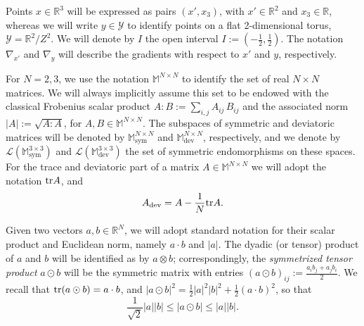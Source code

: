 \documentclass[reqno,10pt]{amsart}
\numberwithin{equation}{section}
\theoremstyle{remark}
\newcommand{\M}{\mathbb{M}}
\newcommand{\R}{\mathbb{R}}
\newcommand{\calY}{\mathcal{Y}}
\DeclareMathOperator{\dev}{dev}
\DeclareMathOperator{\sym}{sym}
\begin{document}
Points $x \in \R^3$ will be expressed as pairs $(x',x_3)$, with $x' \in \R^2$ and $x_3 \in \R$, whereas we will write $y \in \calY$ to identify points on a flat 2-dimensional torus, $\mathcal{Y}=\R^2/ Z^2$.
We will denote by $I$ the open interval $I := \left(-\frac{1}{2}, \frac{1}{2}\right)$.
The notation $\nabla_{x'}$ and $\nabla_{y}$ will describe the gradients with respect to $x'$ and $y$, respectively.

For $N=2,3$, we use the notation $\M^{N \times N}$ to identify the set of real $N \times N$ matrices.
We will always implicitly assume this set to be endowed with the classical Frobenius scalar product $A : B := \sum_{i,j}A_{ij}\,B_{ij}$ and the associated norm $|A| := \sqrt{A:A}$, for $A,B\in \mathbb{M}^{N\times N}$.
The subspaces of symmetric and deviatoric matrices will be denoted by $\M^{N \times N}_{\sym}$ and $\M^{N \times N}_{\dev}$, respectively, and we denote by $\mathcal{L}(\M^{3 \times 3}_{\sym})$ and $\mathcal{L}(\M^{3 \times 3}_{\dev})$ the set of symmetric endomorphisms on these spaces.
For the trace and deviatoric part of a matrix $A \in \mathbb{M}^{N\times N}$ we will adopt the notation ${\rm tr}{A}$, and
\[
	A_{\dev} = A - \frac{1}{N}{\rm tr}{A}.
\]

Given two vectors $a, b \in \R^N$, we will adopt standard notation for their scalar product and Euclidean norm, namely $a \cdot b$ and $|a|$.
The dyadic (or tensor) product of $a$ and $b$ will be identified as by $a \otimes b$; correspondingly, the {\em symmetrized tensor product} $a \odot b$ will be the symmetric matrix with entries $(a \odot b)_{ij} := \frac{a_i b_j + a_j b_i}{2}$.
We recall that ${\rm tr}{\left(a \odot b\right)} = a \cdot b$, and $|a \odot b|^2 = \frac{1}{2}|a|^2|b|^2 + \frac{1}{2}(a \cdot b)^2$, so that
\begin{equation*}
	\frac{1}{\sqrt{2}}|a||b| \leq |a \odot b| \leq |a||b|.
\end{equation*}
\end{document}
